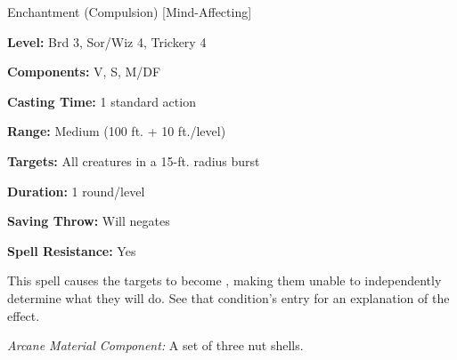 
Enchantment (Compulsion) [Mind-Affecting]

\textbf{Level:} Brd 3, Sor/Wiz 4, Trickery 4

\textbf{Components:} V, S, M/DF

\textbf{Casting Time:} 1 standard action

\textbf{Range:} Medium (100 ft. + 10 ft./level)

\textbf{Targets:} All creatures in a 15-ft. radius burst

\textbf{Duration:} 1 round/level

\textbf{Saving Throw:} Will negates

\textbf{Spell Resistance:} Yes

This spell causes the targets to become , making them unable to 
independently determine what they will do. See that condition's entry for an explanation of the effect.

\textit{Arcane Material Component:} A set of three nut shells.

